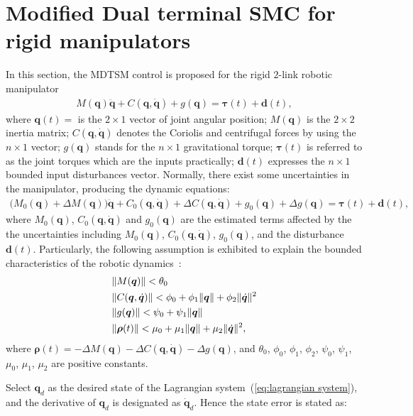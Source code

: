\documentclass[3p]{elsarticle}
\theoremstyle{plain}
\theoremstyle{remark}
\begin{document}
\section{Modified Dual terminal SMC for rigid manipulators}\label{sec:3}
In this section, the MDTSM control is proposed for the rigid $2$-link robotic manipulator
\begin{align}
M(\bm q)\ddot {\bm q}+C(\bm q,\dot {\bm q})+g(\bm q)= \bm\tau(t)+{\bm d}(t),\label{eq:lagrangian system}
\end{align}
where $\bm q(t) = $ is the $2\times 1$ vector of joint angular position; ${M(\bm q)}$ is the $2\times 2$ inertia matrix; ${C(\bm q,\dot{\bm q})}$ denotes the Coriolis and centrifugal forces by using the $n\times1$ vector; ${g(\bm q)}$ stands for the $n\times 1$ gravitational torque; $\bm{\tau}(t)$ is referred to as the joint torques which are the inputs practically; $\bm d(t)$ expresses the $n\times 1$ bounded input disturbances vector. Normally, there exist some uncertainties in the manipulator, producing the dynamic equations:
\begin{align}
(M_0(\bm q)+\Delta {M(\bm q))\ddot {\bm q}}+{C_0(\bm q,\dot {\bm q})+\Delta C(\bm q,\dot {\bm q})}+g_0(\bm q)+\Delta g(\bm q)=\bm {\tau}(t)+\bm{d}(t),
\end{align}
where $M_0(\bm q)$, $C_0(\bm q,\dot {\bm q})$ and $g_0(\bm q)$ are the estimated terms affected by the the uncertainties including $M_0(\bm q)$, $C_0(\bm q,\dot {\bm q})$, $g_0(\bm q)$, and the disturbance $\bm{d}(t)$. Particularly, the following assumption is exhibited to explain the bounded characteristics of the robotic dynamics~\cite{feng2002non}:
\begin{align}
&\Vert M(\bm q)\Vert< \theta_0\notag\\
&\Vert C(\bm q,\dot {\bm q})\Vert< \phi_0+\phi_1\Vert\bm q\Vert+\phi_2\Vert\dot{\bm q}\Vert^2\notag\\
&\Vert g(\bm q)\Vert< \psi_0+\psi_1\Vert\bm q\notag\Vert\\
&\Vert \bm {\rho}(t)\Vert< \mu_0+\mu_1\Vert\bm q\Vert+\mu_2\Vert\dot{\bm q}\Vert^2,\label{eq:manipulator uncertainty}
\end{align}
where $\bm {\rho}(t) = -\Delta M(\bm q)-\Delta C(\bm q,\dot {\bm q})-\Delta g(\bm q)$, and $\theta_0$, $\phi_0$, $\phi_1$, $\phi_2$, $\psi_0$, $\psi_1$, $\mu_0$, $\mu_1$, $\mu_2$ are positive constants.\par
Select $\bm q_d$ as the desired state of the Lagrangian system~(\ref{eq:lagrangian system}), and the derivative of $\bm q_d$ is designated as $\dot {\bm q}_d$. Hence the state error is stated as:
\end{document}
